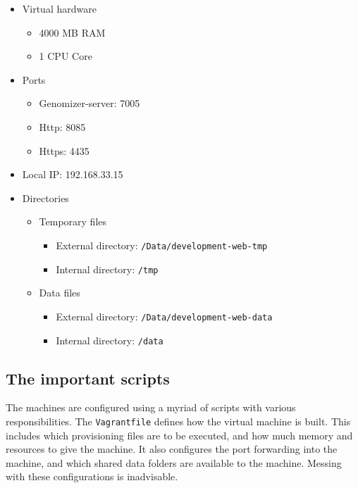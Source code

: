 \begin{itemize}
\itemsep1pt\parskip0pt
\item
  Virtual hardware

  \begin{itemize}
  \itemsep1pt\parskip0pt
  \item
    4000 MB RAM
  \item
    1 CPU Core
  \end{itemize}
\item
  Ports

  \begin{itemize}
  \itemsep1pt\parskip0pt
  \item
    Genomizer-server: 7005
  \item
    Http: 8085
  \item
    Https: 4435
  \end{itemize}
\item
  Local IP: 192.168.33.15
\item
  Directories

  \begin{itemize}
  \itemsep1pt\parskip0pt
  \item
    Temporary files

    \begin{itemize}
    \itemsep1pt\parskip0pt
    \item
      External directory: \texttt{/Data/development-web-tmp}
    \item
      Internal directory: \texttt{/tmp}
    \end{itemize}
  \item
    Data files

    \begin{itemize}
    \itemsep1pt\parskip0pt
    \item
      External directory: \texttt{/Data/development-web-data}
    \item
      Internal directory: \texttt{/data}
    \end{itemize}
  \end{itemize}
\end{itemize}

\subsection{The important scripts}\label{sec:the-important-scripts}

The machines are configured using a myriad of scripts with various
responsibilities. The \texttt{Vagrantfile} defines how the virtual
machine is built. This includes which provisioning files are to be
executed, and how much memory and resources to give the machine. It also
configures the port forwarding into the machine, and which shared data
folders are available to the machine. Messing with these configurations
is inadvisable.


